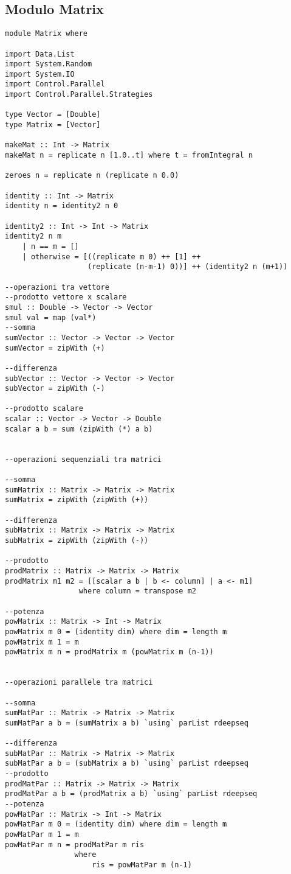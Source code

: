 \subsection{Modulo Matrix}
\begin{verbatim}
module Matrix where

import Data.List
import System.Random
import System.IO
import Control.Parallel
import Control.Parallel.Strategies
    
type Vector = [Double]
type Matrix = [Vector]    

makeMat :: Int -> Matrix
makeMat n = replicate n [1.0..t] where t = fromIntegral n

zeroes n = replicate n (replicate n 0.0)

identity :: Int -> Matrix
identity n = identity2 n 0

identity2 :: Int -> Int -> Matrix
identity2 n m 
    | n == m = []
    | otherwise = [((replicate m 0) ++ [1] ++ 
                   (replicate (n-m-1) 0))] ++ (identity2 n (m+1))  

--operazioni tra vettore
--prodotto vettore x scalare
smul :: Double -> Vector -> Vector
smul val = map (val*)
--somma
sumVector :: Vector -> Vector -> Vector
sumVector = zipWith (+)

--differenza
subVector :: Vector -> Vector -> Vector
subVector = zipWith (-)

--prodotto scalare                      
scalar :: Vector -> Vector -> Double
scalar a b = sum (zipWith (*) a b)


--operazioni sequenziali tra matrici

--somma 
sumMatrix :: Matrix -> Matrix -> Matrix
sumMatrix = zipWith (zipWith (+))

--differenza
subMatrix :: Matrix -> Matrix -> Matrix
subMatrix = zipWith (zipWith (-))

--prodotto
prodMatrix :: Matrix -> Matrix -> Matrix
prodMatrix m1 m2 = [[scalar a b | b <- column] | a <- m1]
                 where column = transpose m2

--potenza
powMatrix :: Matrix -> Int -> Matrix
powMatrix m 0 = (identity dim) where dim = length m
powMatrix m 1 = m
powMatrix m n = prodMatrix m (powMatrix m (n-1))
    
    
--operazioni parallele tra matrici

--somma    
sumMatPar :: Matrix -> Matrix -> Matrix
sumMatPar a b = (sumMatrix a b) `using` parList rdeepseq

--differenza
subMatPar :: Matrix -> Matrix -> Matrix
subMatPar a b = (subMatrix a b) `using` parList rdeepseq
--prodotto
prodMatPar :: Matrix -> Matrix -> Matrix
prodMatPar a b = (prodMatrix a b) `using` parList rdeepseq
--potenza      
powMatPar :: Matrix -> Int -> Matrix
powMatPar m 0 = (identity dim) where dim = length m
powMatPar m 1 = m
powMatPar m n = prodMatPar m ris
                where
                    ris = powMatPar m (n-1)


\end{verbatim}
